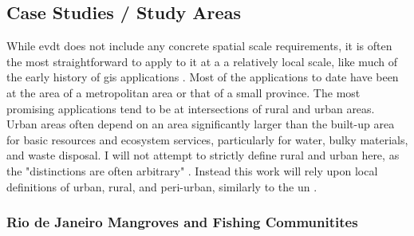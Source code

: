 \documentclass[notitlepage]{article}
\begin{document}
\subsection{Case Studies / Study Areas}

While \ac{evdt} does not include any concrete spatial scale requirements, it is often the most straightforward to apply to it at a a relatively local scale, like much of the early history of \ac{gis} applications \cite{tullochInstitutionalGeographicInformation2007}. Most of the applications to date have been at the area of a metropolitan area or that of a small province. The most promising applications tend to be at intersections of rural and urban areas. Urban areas often depend on an area significantly larger than the built-up area for basic resources and ecosystem services, particularly for water, bulky materials, and waste disposal. I will not attempt to strictly define rural and urban here, as the "distinctions are often arbitrary" \cite{tacoliRuralurbanInteractionsGuide1998}. Instead this work will rely upon local definitions of urban, rural, and peri-urban, similarly to the \ac{un} \cite{sachsAgeSustainableDevelopment2015}. 

\subsubsection{Rio de Janeiro Mangroves and Fishing Communitites}
\end{document}
